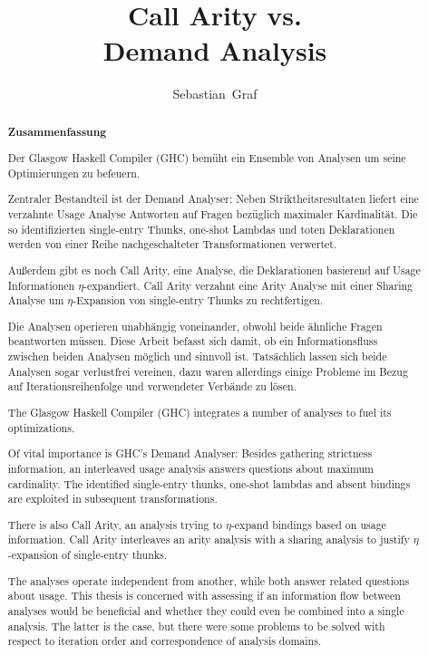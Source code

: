 \documentclass[12pt,a4paper,twoside,headings=openright]{scrreprt}
\title{Call Arity vs.\\Demand Analysis}
\author{Sebastian~Graf}
\begin{document}
\begin{otherlanguage}{ngerman} %
\mytitlepage
\end{otherlanguage}

\begin{abstract}
\begin{center}\Huge\textbf{\textsf{Zusammenfassung}}
\end{center}
\vfill

  Der Glasgow Haskell Compiler (GHC) bemüht ein Ensemble von Analysen um seine Optimierungen zu befeuern.

  Zentraler Bestandteil ist der Demand Analyser:
  Neben Striktheitsresultaten liefert eine verzahnte Usage Analyse Antworten auf Fragen bezüglich maximaler Kardinalität.
  Die so identifizierten single-entry Thunks, one-shot Lambdas und toten Deklarationen werden von einer Reihe nachgeschalteter Transformationen verwertet.

  Außerdem gibt es noch Call Arity, eine Analyse, die Deklarationen basierend auf Usage Informationen $\eta$-expandiert.
  Call Arity verzahnt eine Arity Analyse mit einer Sharing Analyse um $\eta$-Expansion von single-entry Thunks zu rechtfertigen.

  Die Analysen operieren unabhängig voneinander, obwohl beide ähnliche Fragen beantworten müssen.
  Diese Arbeit befasst sich damit, ob ein Informationsfluss zwischen beiden Analysen möglich und sinnvoll ist.
  Tatsächlich lassen sich beide Analysen sogar verlustfrei vereinen, dazu waren allerdings einige Probleme im Bezug auf Iterationsreihenfolge und verwendeter Verbände zu lösen.

\vfill

  The Glasgow Haskell Compiler (GHC) integrates a number of analyses to fuel its optimizations.

  Of vital importance is GHC's Demand Analyser: Besides gathering strictness information, an interleaved usage analysis answers questions about maximum cardinality.
  The identified single-entry thunks, one-shot lambdas and absent bindings are exploited in subsequent transformations.

  There is also Call Arity, an analysis trying to $\eta$-expand bindings based on usage information. 
  Call Arity interleaves an arity analysis with a sharing analysis to justify $\eta$-expansion of single-entry thunks.

  The analyses operate independent from another, while both answer related questions about usage. 
  This thesis is concerned with assessing if an information flow between analyses would be beneficial and whether they could even be combined into a single analysis. 
  The latter is the case, but there were some problems to be solved with respect to iteration order and correspondence of analysis domains.

\vfill

\end{abstract}
\end{document}
